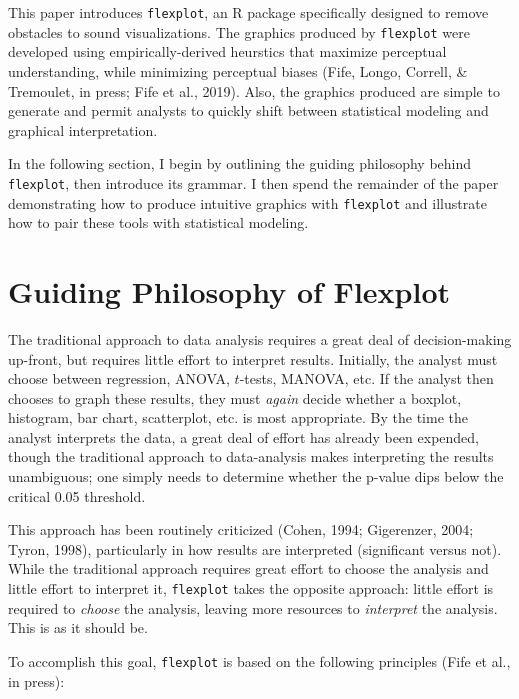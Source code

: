 \documentclass[
  english,
  man]{apa6}
\begin{document}
This paper introduces \texttt{flexplot}, an R package specifically designed to remove obstacles to sound visualizations. The graphics produced by \texttt{flexplot} were developed using empirically-derived heurstics that maximize perceptual understanding, while minimizing perceptual biases (Fife, Longo, Correll, \& Tremoulet, in press; Fife et al., 2019). Also, the graphics produced are simple to generate and permit analysts to quickly shift between statistical modeling and graphical interpretation.

In the following section, I begin by outlining the guiding philosophy behind \texttt{flexplot}, then introduce its grammar. I then spend the remainder of the paper demonstrating how to produce intuitive graphics with \texttt{flexplot} and illustrate how to pair these tools with statistical modeling.

\hypertarget{guiding-philosophy-of-flexplot}{%
\section{Guiding Philosophy of Flexplot}\label{guiding-philosophy-of-flexplot}}

The traditional approach to data analysis requires a great deal of decision-making up-front, but requires little effort to interpret results. Initially, the analyst must choose between regression, ANOVA, \(t\)-tests, MANOVA, etc. If the analyst then chooses to graph these results, they must \emph{again} decide whether a boxplot, histogram, bar chart, scatterplot, etc. is most appropriate. By the time the analyst interprets the data, a great deal of effort has already been expended, though the traditional approach to data-analysis makes interpreting the results unambiguous; one simply needs to determine whether the p-value dips below the critical 0.05 threshold.

This approach has been routinely criticized (Cohen, 1994; Gigerenzer, 2004; Tyron, 1998), particularly in how results are interpreted (significant versus not). While the traditional approach requires great effort to choose the analysis and little effort to interpret it, \texttt{flexplot} takes the opposite approach: little effort is required to \emph{choose} the analysis, leaving more resources to \emph{interpret} the analysis. This is as it should be.

To accomplish this goal, \texttt{flexplot} is based on the following principles (Fife et al., in press):
\end{document}
